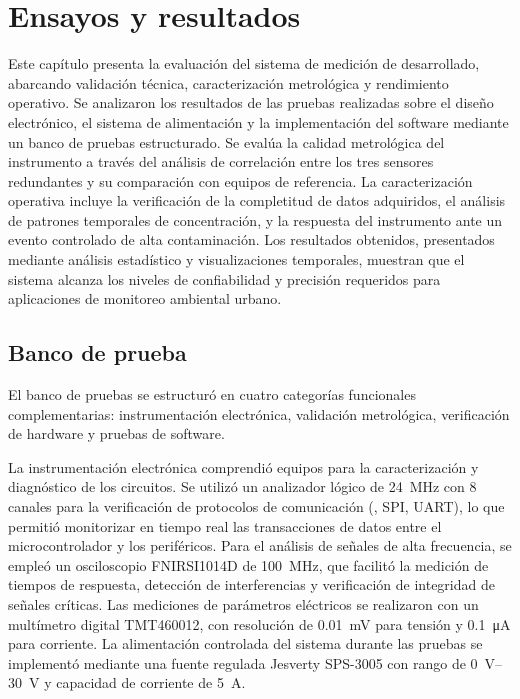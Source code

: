 
\chapter{Ensayos y resultados} %
\label{Chapter4} %


Este capítulo presenta la evaluación del sistema de medición de \MPF desarrollado, abarcando validación técnica, caracterización metrológica y rendimiento operativo. Se analizaron los resultados de las pruebas realizadas sobre el diseño electrónico, el sistema de alimentación y la implementación del software mediante un banco de pruebas estructurado. Se evalúa la calidad metrológica del instrumento a través del análisis de correlación entre los tres sensores redundantes y su comparación con equipos de referencia. La caracterización operativa incluye la verificación de la completitud de datos adquiridos, el análisis de patrones temporales de concentración, y la respuesta del instrumento ante un evento controlado de alta contaminación. Los resultados obtenidos, presentados mediante análisis estadístico y visualizaciones temporales, muestran que el sistema alcanza los niveles de confiabilidad y precisión requeridos para aplicaciones de monitoreo ambiental urbano.

\section{Banco de prueba} 




El banco de pruebas se estructuró en cuatro categorías funcionales complementarias: instrumentación electrónica, validación metrológica, verificación de hardware y pruebas de software.

La instrumentación electrónica comprendió equipos para la caracterización y diagnóstico de los circuitos. Se utilizó un analizador lógico de \SI{24}{\mega\hertz} con 8 canales para la verificación de protocolos de comunicación (\IIC, SPI, UART), lo que permitió monitorizar en tiempo real las transacciones de datos entre el microcontrolador y los periféricos. Para el análisis de señales de alta frecuencia, se empleó un osciloscopio FNIRSI1014D de \SI{100}{\mega\hertz}, que facilitó la medición de tiempos de respuesta, detección de interferencias y verificación de integridad de señales críticas. Las mediciones de parámetros eléctricos se realizaron con un multímetro digital TMT460012, con resolución de \SI{0.01}{\milli\volt} para tensión y \SI{0.1}{\micro\ampere} para corriente. La alimentación controlada del sistema durante las pruebas se implementó mediante una fuente regulada Jesverty SPS-3005 con rango de \SIrange{0}{30}{\volt} y capacidad de corriente de \SI{5}{\ampere}.

